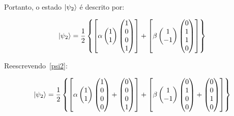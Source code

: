 Portanto, o estado $\ket{\psi_2}$ é descrito por:

\begin{align}\label{psi2}
\ket{\psi_2} = \frac{1}{2} \left\{\left[ \alpha \begin{pmatrix}
1 \\
1 
\end{pmatrix} \begin{pmatrix}
1 \\
0 \\
0 \\
1
\end{pmatrix}\right] + \left[\beta \begin{pmatrix}
1 \\
-1
\end{pmatrix} \begin{pmatrix}
0 \\
1 \\
1 \\
0
\end{pmatrix}\right]\right\}
\end{align}

Reescrevendo~\eqref{psi2}:

\begin{equation}\label{psi2aberto}
\ket{\psi_2} = \frac{1}{2} \left\{\left[ \alpha \begin{pmatrix}
1 \\
1 
\end{pmatrix} \begin{pmatrix}
1 \\
0 \\
0 \\
0
\end{pmatrix} +\begin{pmatrix}
0 \\
0 \\
0 \\
1
\end{pmatrix} \right] + \left[\beta \begin{pmatrix}
1 \\
-1
\end{pmatrix} \begin{pmatrix}
0 \\
1 \\
0 \\
0
\end{pmatrix} + \begin{pmatrix}
0 \\
0 \\
1 \\
0
\end{pmatrix}\right]\right\}
\end{equation}

